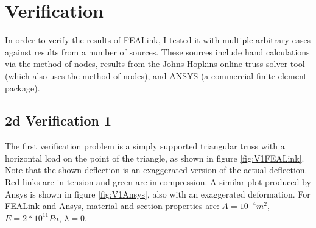 \documentclass[11pt, oneside]{article}   	%
\begin{document}

\section{Verification}
In order to verify the results of FEALink, I tested it with multiple arbitrary cases against results from a number of sources.  These sources include hand calculations via the method of nodes, results from the Johns Hopkins online truss solver tool (which also uses the method of nodes), and ANSYS (a commercial finite element package). 

\subsection{2d Verification 1}
The first verification problem is a simply supported triangular truss with a horizontal load on the point of the triangle, as shown in figure \ref{fig:V1FEALink}.  Note that the shown deflection is an exaggerated version of the actual deflection.  Red links are in tension and green are in compression.  A similar plot produced by Ansys is shown in figure \ref{fig:V1Ansys}, also with an exaggerated deformation.  For FEALink and Ansys, material and section properties are: $ A = 10^{-4} m^2 $, $ E = 2*10^{11} Pa $, $ \lambda = 0 $.
\end{document}
